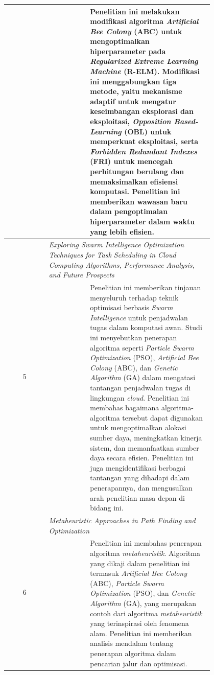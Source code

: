 \begin{longtable}{|c|m{0.2\linewidth}|m{0.6\linewidth}|}
                   & \multicolumn{1}{c|}{\parencite{Vasquez2024}} & Penelitian ini melakukan modifikasi algoritma \textit{Artificial Bee Colony} (ABC) untuk mengoptimalkan hiperparameter pada \textit{Regularized Extreme Learning Machine} (R-ELM). Modifikasi ini menggabungkan tiga metode, yaitu mekanisme adaptif untuk mengatur keseimbangan eksplorasi dan eksploitasi, \textit{Opposition Based-Learning} (OBL) untuk memperkuat eksploitasi, serta \textit{Forbidden Redundant Indexes} (FRI) untuk mencegah perhitungan berulang dan memaksimalkan efisiensi komputasi. Penelitian ini memberikan wawasan baru dalam pengoptimalan hiperparameter dalam waktu yang lebih efisien. \\ \hline
    \multirow{2}{*}{5} & \multicolumn{2}{|p{\dimexpr0.9\linewidth}|}{\textit{Exploring Swarm Intelligence Optimization Techniques for Task Scheduling in Cloud Computing Algorithms, Performance Analysis, and Future Prospects}} \\ \cline{2-3}
                   & \multicolumn{1}{c|}{\parencite{Prity2024}} & Penelitian ini memberikan tinjauan menyeluruh terhadap teknik optimisasi berbasis \textit{Swarm Intelligence} untuk penjadwalan tugas dalam komputasi awan. Studi ini menyebutkan penerapan algoritma seperti \textit{Particle Swarm Optimization} (PSO), \textit{Artificial Bee Colony} (ABC), dan \textit{Genetic Algorithm} (GA) dalam mengatasi tantangan penjadwalan tugas di lingkungan \textit{cloud}. Penelitian ini membahas bagaimana algoritma-algoritma tersebut dapat digunakan untuk mengoptimalkan alokasi sumber daya, meningkatkan kinerja sistem, dan memanfaatkan sumber daya secara efisien. Penelitian ini juga mengidentifikasi berbagai tantangan yang dihadapi dalam penerapannya, dan mengusulkan arah penelitian masa depan di bidang ini. \\ \hline
    \multirow{2}{*}{6} & \multicolumn{2}{|p{\dimexpr0.9\linewidth}|}{\textit{Metaheuristic Approaches in Path Finding and Optimization}} \\ \cline{2-3}
                   & \multicolumn{1}{c|}{\parencite{Trivedi2025}} & Penelitian ini membahas penerapan algoritma \textit{metaheuristik}. Algoritma yang dikaji dalam penelitian ini termasuk \textit{Artificial Bee Colony} (ABC), \textit{Particle Swarm Optimization} (PSO), dan \textit{Genetic Algorithm} (GA), yang merupakan contoh dari algoritma \textit{metaheuristik} yang terinspirasi oleh fenomena alam. Penelitian ini memberikan analisis mendalam tentang penerapan algoritma dalam pencarian jalur dan optimisasi. \\ \hline

\end{longtable}
